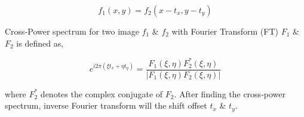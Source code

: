 \documentclass{report}
\begin{document}
\begin{equation}\label{eq:translation}
    f_1 (x,y) = f_2 (x-t_x,y-t_y)    
\end{equation}

\noindent
Cross-Power spectrum for two image ${f_1}$ \& ${f_2}$ with Fourier Transform (FT) ${F_1}$ \& ${F_2}$ is defined as,

\begin{equation}\label{eq:cross-power-spectrum}
    e^{i2\pi (\xi t_x + \eta t_y)} = \frac{ F_1(\xi,\eta) F_2^*(\xi,\eta)}{ |F_1(\xi,\eta) F_2(\xi,\eta)| }     
\end{equation}

\noindent
where ${F_2^*}$ denotes the complex conjugate of ${F_2}$. After finding the cross-power spectrum, inverse Fourier transform will the shift offset ${t_x}$ \& ${t_y}$. \\
\end{document}
